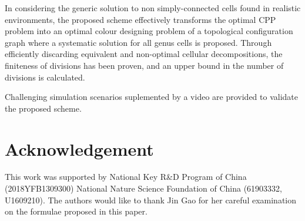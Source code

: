 \documentclass[journal]{IEEEtran}
\begin{document}
In considering the generic solution to non simply-connected cells found in realistic 
environments, the proposed scheme effectively transforms the optimal CPP problem into an optimal colour designing problem of a topological configuration graph where a systematic solution for all genus cells is proposed. Through efficiently discarding equivalent and non-optimal cellular decompositions, the finiteness of divisions has been proven, and an upper bound in the number of divisions is calculated. 

Challenging simulation scenarios suplemented by a video are provided to validate the proposed scheme.

\vfill

\section*{Acknowledgement}
This work was supported by National Key R\&D Program of China (2018YFB1309300) National Nature Science Foundation of China (61903332, U1609210).
The authors would like to thank Jin Gao for her careful examination on the formulae proposed in this paper. 

\vfill

\newpage %



\end{document}

